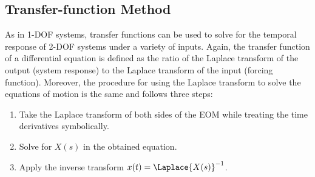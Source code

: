 \documentclass[12pt,letter]{article}
\begin{document}
	
	
	
	
	
	
	\subsection{Transfer-function Method}
	
	As in 1-DOF systems, transfer functions can be used to solve for the temporal response of 2-DOF systems under a variety of inputs. Again, the transfer function of a differential equation is defined as the ratio of the Laplace transform of the output (system response) to the Laplace transform of the input (forcing function). Moreover, the procedure for using the Laplace transform to solve the equations of motion is the same and follows three steps:
	\begin{enumerate}
		\item Take the Laplace transform of both sides of the EOM while treating the time derivatives symbolically.
		\item Solve for $X(s)$ in the obtained equation.
		\item Apply the inverse transform $x(t) = \Laplace{X(s)}^{-1}$.
	\end{enumerate}
	
\end{document}
